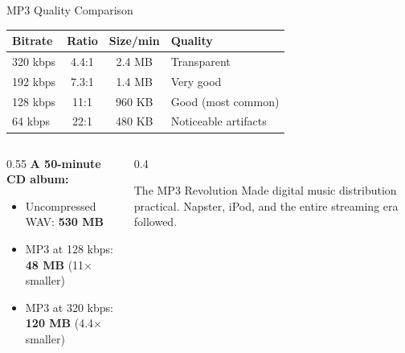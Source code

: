 \documentclass[aspectratio=169,12pt]{beamer}
\begin{document}
\begin{frame}{MP3 Quality Comparison}
    \begin{center}
        \small
        \begin{tabular}{l|c|c|l}
            \toprule
            \textbf{Bitrate} & \textbf{Ratio} & \textbf{Size/min} & \textbf{Quality} \\
            \midrule
            320 kbps & 4.4:1 & 2.4 MB & Transparent \\
            192 kbps & 7.3:1 & 1.4 MB & Very good \\
            128 kbps & 11:1 & 960 KB & Good (most common) \\
            64 kbps & 22:1 & 480 KB & Noticeable artifacts \\
            \bottomrule
        \end{tabular}
    \end{center}
    
    \vspace{0.2cm}
    \begin{columns}
        \begin{column}{0.55\textwidth}
            \textbf{A 50-minute CD album:}
            \begin{itemize}
                \item Uncompressed WAV: \textbf{530 MB}
                \item MP3 at 128 kbps: \textbf{48 MB} (11$\times$ smaller)
                \item MP3 at 320 kbps: \textbf{120 MB} (4.4$\times$ smaller)
            \end{itemize}
        \end{column}
        \begin{column}{0.4\textwidth}
            \begin{alertblock}{The MP3 Revolution}
                Made digital music distribution practical. Napster, iPod, and the entire streaming era followed.
            \end{alertblock}
        \end{column}
    \end{columns}
\end{frame}
\end{document}
